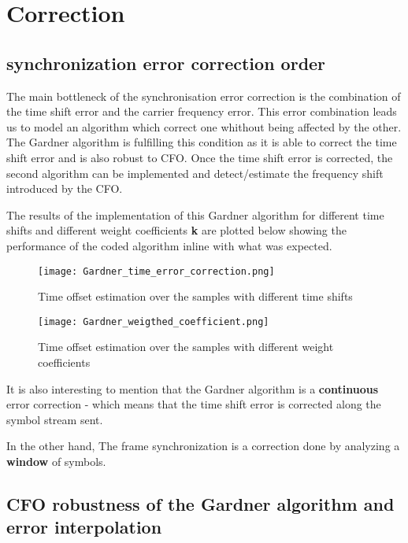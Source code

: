 \section{Correction}

\subsection{synchronization error correction order}

The main bottleneck of the synchronisation error correction is the combination of the time shift error and
 the carrier frequency error.
This error combination leads us to model an algorithm which correct one whithout being affected by the other.
The Gardner algorithm is fulfilling this condition as it is able to correct the time shift error and is also robust to CFO.
Once the time shift error is corrected, the second algorithm can be implemented and detect/estimate the frequency shift introduced by the CFO.\newline

The results of the implementation of this Gardner algorithm for different time shifts and different weight coefficients \textbf{k} are plotted below
showing the performance of the coded algorithm inline with what was expected.

\begin{figure}[H]
    \centering
    \texttt{[image: Gardner\_time\_error\_correction.png]}
    \caption{Time offset estimation over the samples with different time shifts}
    \label{fig:Gardner_time_error_correction}
\end{figure}

\begin{figure}[H]
    \centering
    \texttt{[image: Gardner\_weigthed\_coefficient.png]}
    \caption{Time offset estimation over the samples with different weight coefficients}
    \label{fig:Gardner_weigthed_coefficient}
\end{figure}

It is also interesting to mention that the Gardner algorithm is a \textbf{continuous} error correction - which means that
the time shift error is corrected along the symbol stream sent.\par
In the other hand, The frame synchronization is a correction done by analyzing a \textbf{window} of symbols.

\subsection{CFO robustness of the Gardner algorithm and error interpolation}

